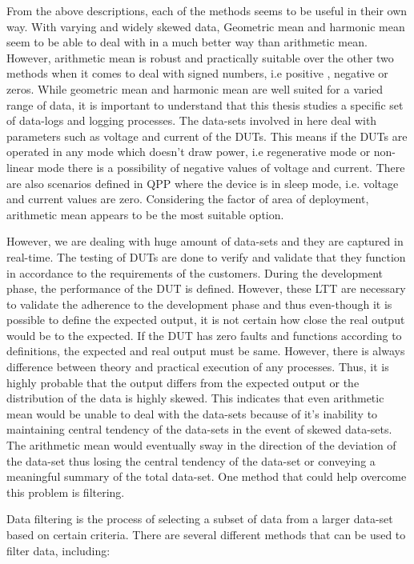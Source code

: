 From the above descriptions, each of the methods seems to be useful in their own way. With varying and widely skewed data, Geometric mean and harmonic mean seem to be able to deal with in a much better way than arithmetic mean. However, arithmetic mean is robust and practically suitable over the other two methods when it comes to deal with signed numbers, i.e positive , negative or zeros. While geometric mean and harmonic mean are well suited for a varied range of data, it is important to understand that this thesis studies a specific set of data-logs and logging processes. The data-sets involved in here deal with parameters such as voltage and current of the DUTs. This means if the DUTs are operated in any mode which doesn't draw power, i.e regenerative mode or non-linear mode there is a possibility of negative values of voltage and current. There are also scenarios defined in QPP where the device is in sleep mode, i.e. voltage and current values are zero. Considering the factor of area of deployment, arithmetic mean appears to be the most suitable option.

However, we are dealing with huge amount of data-sets and they are captured in real-time. The testing of DUTs are done to verify and validate that they function in accordance to the requirements of the customers. During the development phase, the performance of the DUT is defined. However, these LTT are necessary to validate the adherence to the development phase and thus even-though it is possible to define the expected output, it is not certain how close the real output would be to the expected. If the DUT has zero faults and functions according to definitions, the expected and real output must be same. However, there is always difference between theory and practical execution of any processes. Thus, it is highly probable that the output differs from the expected output or the distribution of the data is highly skewed. This indicates that even arithmetic mean would be unable to deal with the data-sets because of it's inability to maintaining central tendency of the data-sets in the event of skewed data-sets. The arithmetic mean would eventually sway in the direction of the deviation of the data-set thus losing the central tendency of the data-set or conveying a meaningful summary of the total data-set. One method that could help overcome this problem is filtering.

Data filtering is the process of selecting a subset of data from a larger data-set based on certain criteria. There are several different methods that can be used to filter data, including:

